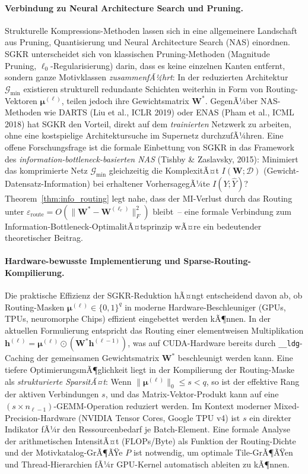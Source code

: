﻿\documentclass[12pt, a4paper, openany]{report}
\newcommand{\calG}{\mathcal{G}}
\newcommand{\calD}{\mathcal{D}}
\begin{document}
\paragraph{Verbindung zu Neural Architecture Search und Pruning.}
Strukturelle Kompres\-sions-Methoden lassen sich in eine allgemeinere Landschaft
aus Pruning, Quantisierung und Neural Architecture Search (NAS) einordnen.
SGKR unterscheidet sich von klassischen Pruning-Methoden (Magnitude Pruning,
$\ell_0$-Regularisierung) darin, dass es keine einzelnen Kanten entfernt,
sondern ganze Motivklassen \emph{zusammenfÃ¼hrt}: In der reduzierten
Architektur $\calG_{\min}$ existieren strukturell redundante Schichten
weiterhin in Form von Routing-Vektoren $\bm{\mu}^{(\ell)}$, teilen jedoch
ihre Gewichtsmatrix $\bm{W}^*$.  GegenÃ¼ber NAS-Methoden wie DARTS
(Liu et al., ICLR 2019) oder ENAS (Pham et al., ICML 2018) hat SGKR den
Vorteil, direkt auf dem \emph{trainierten} Netzwerk zu arbeiten, ohne eine
kostspielige Architektursuche im Supernetz durchzufÃ¼hren.  Eine offene
Forschungsfrage ist die formale Einbettung von SGKR in das Framework des
\emph{information-bottleneck-basierten NAS} (Tishby \& Zaslavsky, 2015):
Minimiert das komprimierte Netz $\calG_{\min}$ gleichzeitig die
KomplexitÃ¤t $I(\bm{W};\calD)$ (Gewicht-Datensatz-Information) bei erhaltener
VorhersagegÃ¼te $I(Y;\hat{Y})$?  Theorem~\ref{thm:info_routing} legt nahe,
dass der MI-Verlust durch das Routing unter
$\varepsilon_{\mathrm{route}} = O(\|\bm{W}^* - \bm{W}^{(\ell_r)}\|_F^2)$
bleibt~-- eine formale Verbindung zum Information-Bottleneck-OptimalitÃ¤tsprinzip
wÃ¤re ein bedeutender theoretischer Beitrag.

\paragraph{Hardware-bewusste Implementierung und Sparse-Routing-Kompilierung.}
Die praktische Effizienz der SGKR-Reduktion hÃ¤ngt entscheidend davon ab,
ob Routing-Masken $\bm{\mu}^{(\ell)} \in \{0,1\}^q$ in moderne Hardware-Beschleuniger
(GPUs, TPUs, neuromorphe Chips) effizient eingebettet werden kÃ¶nnen.  In der
aktuellen Formulierung entspricht das Routing einer elementweisen
Multiplikation $\bm{h}^{(\ell)} = \bm{\mu}^{(\ell)} \odot (\bm{W}^*
\bm{h}^{(\ell-1)})$, was auf CUDA-Hardware bereits durch
\texttt{\_\_ldg}-Caching der gemeinsamen Gewichtsmatrix $\bm{W}^*$
beschleunigt werden kann.  Eine tiefere OptimierungsmÃ¶glichkeit liegt in
der Kompilierung der Routing-Maske als \emph{strukturierte SparsitÃ¤t}: Wenn
$\|\bm{\mu}^{(\ell)}\|_0 \leq s < q$, so ist der effektive Rang der aktiven
Verbindungen $s$, und das Matrix-Vektor-Produkt kann auf eine
$(s \times n_{\ell-1})$-GEMM-Operation reduziert werden.  Im Kontext moderner
Mixed-Precision-Hardware (NVIDIA Tensor Cores, Google TPU v4) ist $s$ ein
direkter Indikator fÃ¼r den Ressourcenbedarf je Batch-Element.  Eine formale
Analyse der arithmetischen IntensitÃ¤t (FLOPs/Byte) als Funktion der
Routing-Dichte und der Motivkatalog-GrÃ¶ÃŸe $P$ ist notwendig, um optimale
Tile-GrÃ¶ÃŸen und Thread-Hierarchien fÃ¼r GPU-Kernel automatisch ableiten zu
kÃ¶nnen.
\end{document}
